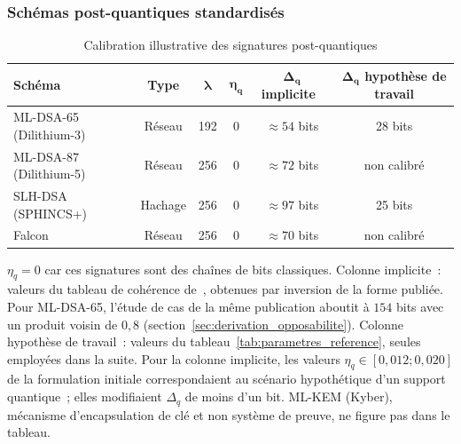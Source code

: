 \begin{sloppypar}
\subsubsection{Sch\'emas post-quantiques standardis\'es}

\begin{table}[htbp]
\centering
\caption{Calibration illustrative des signatures post-quantiques}
\label{tab:validation_pqc}
\begin{tabular}{@{}lccccc@{}}
\toprule
\textbf{Sch\'ema} & \textbf{Type} & $\boldsymbol{\lambda}$ & $\boldsymbol{\eta_q}$ & $\boldsymbol{\Delta_q}$ \textbf{implicite}~\cite{MINKA2026PQCRO} & $\boldsymbol{\Delta_q}$ \textbf{hypoth\`ese de travail} \\
\midrule
ML-DSA-65 (Dilithium-3)~\cite{Dilithium2022} & R\'eseau & 192 & $0$ & $\approx 54$ bits & 28 bits \\
ML-DSA-87 (Dilithium-5)~\cite{Dilithium2022} & R\'eseau & 256 & $0$ & $\approx 72$ bits & non calibr\'e \\
SLH-DSA (SPHINCS+)~\cite{SPHINCS2022} & Hachage & 256 & $0$ & $\approx 97$ bits & 25 bits \\
Falcon~\cite{Falcon2022} & R\'eseau & 256 & $0$ & $\approx 70$ bits & non calibr\'e \\
\bottomrule
\end{tabular}
\begin{tablenotes}
\item \footnotesize $\eta_q = 0$ car ces signatures sont des cha\^ines de bits classiques. Colonne implicite~: valeurs du tableau de coh\'erence de~\cite{MINKA2026PQCRO}, obtenues par inversion de la forme publi\'ee. Pour ML-DSA-65, l'\'etude de cas de la m\^eme publication aboutit \`a $154$ bits avec un produit voisin de $0{,}8$ (section~\ref{sec:derivation_opposabilite}). Colonne hypoth\`ese de travail~: valeurs du tableau~\ref{tab:parametres_reference}, seules employ\'ees dans la suite. Pour la colonne implicite, les valeurs $\eta_q \in [0{,}012 ; 0{,}020]$ de la formulation initiale correspondaient au sc\'enario hypoth\'etique d'un support quantique~; elles modifiaient $\Delta_q$ de moins d'un bit. ML-KEM (Kyber), m\'ecanisme d'encapsulation de cl\'e et non syst\`eme de preuve, ne figure pas dans le tableau.
\end{tablenotes}
\end{table}


\end{sloppypar}
